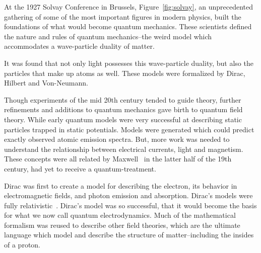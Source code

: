 At the 1927 Solvay Conference in Brussels, Figure~\ref{fig:solvay}, an
unprecedented gathering of some of the most important figures in modern physics,
built the foundations of what would become quantum mechanics. These scientists
defined the nature and rules of quantum mechanics--the weird model which
accommodates a wave-particle duality of matter. 

It was found that not only light possesses this wave-particle duality, but also
the particles that make up atoms as well. These models were formalized by Dirac,
Hilbert and Von-Neumann.

Though experiments of the mid 20th century tended to guide theory, further
refinements and additions to quantum mechanics gave birth to quantum field
theory. While early quantum models were very successful at describing static
particles trapped in static potentials. Models were generated which could
predict exactly observed atomic emission spectra. But, more work was needed to
understand the relationship between electrical currents, light and magnetism.
These concepts were all related by Maxwell~\cite{Maxwell1865} in the latter half
of the 19th century, had yet to receive a quantum-treatment.

Dirac was first to create a model for describing the electron, its behavior in
electromagnetic fields, and photon emission and absorption. Dirac's models were
fully relativistic~\cite{Dirac}. Dirac's model was so successful, that it would
become the basis for what we now call quantum electrodynamics.  Much of the
mathematical formalism was reused to describe other field theories, which are
the ultimate language which model and describe the structure of
matter--including the insides of a proton. 

